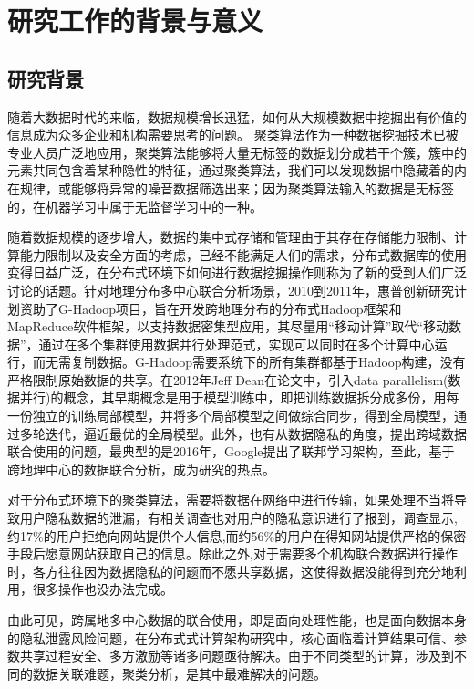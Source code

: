 \thesischapterexordium

\section{研究工作的背景与意义}

\subsection{研究背景}

随着大数据时代的来临，数据规模增长迅猛，如何从大规模数据中挖掘出有价值的信息成为众多企业和机构需要思考的问题。
聚类算法作为一种数据挖掘技术已被专业人员广泛地应用，聚类算法能够将大量无标签的数据划分成若干个簇，簇中的元素共同包含着某种隐性的特征，通过聚类算法，我们可以发现数据中隐藏着的内在规律，或能够将异常的噪音数据筛选出来；因为聚类算法输入的数据是无标签的，在机器学习中属于无监督学习中的一种。

随着数据规模的逐步增大，数据的集中式存储和管理由于其存在存储能力限制、计算能力限制以及安全方面的考虑，已经不能满足人们的需求，分布式数据库的使用变得日益广泛，在分布式环境下如何进行数据挖掘操作则称为了新的受到人们广泛讨论的话题。针对地理分布多中心联合分析场景，2010到2011年，惠普创新研究计划资助了G-Hadoop项目，旨在开发跨地理分布的分布式Hadoop框架和MapReduce软件框架，以支持数据密集型应用，其尽量用“移动计算”取代“移动数据”，通过在多个集群使用数据并行处理范式，实现可以同时在多个计算中心运行，而无需复制数据。G-Hadoop需要系统下的所有集群都基于Hadoop构建，没有严格限制原始数据的共享。在2012年Jeff Dean在论文\cite{dean2012large}中，引入data parallelism(数据并行)的概念，其早期概念是用于模型训练中，即把训练数据拆分成多份，用每一份独立的训练局部模型，并将多个局部模型之间做综合同步，得到全局模型，通过多轮迭代，逼近最优的全局模型。此外，也有从数据隐私的角度，提出跨域数据联合使用的问题，最典型的是2016年，Google提出了联邦学习架构，至此，基于跨地理中心的数据联合分析，成为研究的热点。

对于分布式环境下的聚类算法，需要将数据在网络中进行传输，如果处理不当将导致用户隐私数据的泄漏，有相关调查也对用户的隐私意识进行了报到，调查显示,约17\%的用户拒绝向网站提供个人信息,而约56\%的用户在得知网站提供严格的保密手段后愿意网站获取自己的信息。除此之外,对于需要多个机构联合数据进行操作时，各方往往因为数据隐私的问题而不愿共享数据，这使得数据没能得到充分地利用，很多操作也没办法完成。


由此可见，跨属地多中心数据的联合使用，即是面向处理性能，也是面向数据本身的隐私泄露风险问题，在分布式式计算架构研究中，核心面临着计算结果可信、参数共享过程安全、多方激励等诸多问题亟待解决。由于不同类型的计算，涉及到不同的数据关联难题，聚类分析，是其中最难解决的问题。


